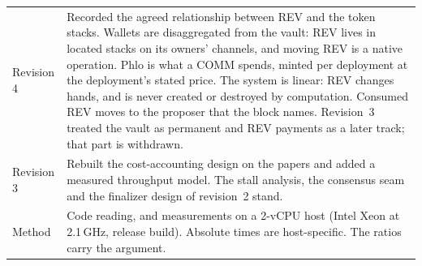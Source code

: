 \documentclass[11pt]{article}
\begin{document}
\begin{center}
\begin{tabular}{@{}lP{10.6cm}@{}}
Revision 4 & Recorded the agreed relationship between REV and the token stacks. Wallets are disaggregated from the vault: REV lives in located stacks on its owners' channels, and moving REV is a native operation. Phlo is what a COMM spends, minted per deployment at the deployment's stated price. The system is linear: REV changes hands, and is never created or destroyed by computation. Consumed REV moves to the proposer that the block names. Revision~3 treated the vault as permanent and REV payments as a later track; that part is withdrawn. \\
Revision 3 & Rebuilt the cost-accounting design on the papers and added a measured throughput model. The stall analysis, the consensus seam and the finalizer design of revision~2 stand. \\
Method & Code reading, and measurements on a 2-vCPU host (Intel Xeon at 2.1\,GHz, release build). Absolute times are host-specific. The ratios carry the argument. \\
\bottomrule
\end{tabular}
\end{center}
\end{document}
